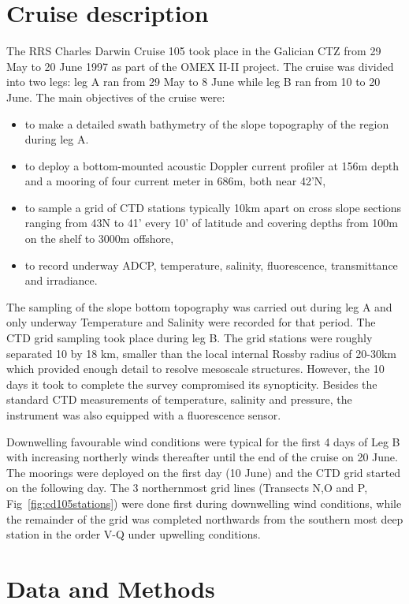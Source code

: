 \section{Cruise description}
The RRS Charles Darwin Cruise 105 took place in the Galician CTZ
from 29 May to 20 June 1997 as part of the OMEX II-II project. The
cruise was divided into two legs: leg A ran from 29 May to 8 June
while leg B ran from 10 to 20 June. The main objectives of the
cruise were:

\begin{itemize}
  \item  to make a detailed swath bathymetry of the slope topography of the
  region during leg A.
  \item  to deploy a
bottom-mounted acoustic Doppler current profiler at 156m depth and
a mooring of four current meter in 686m, both near 42'N,
  \item to sample a grid of CTD stations typically 10km apart on
  cross slope sections ranging from 43\deg N to 41' every 10' of latitude
  and covering depths from 100m on the shelf to 3000m offshore,
  \item to record underway ADCP, temperature, salinity,
  fluorescence, transmittance and irradiance.
\end{itemize}
The sampling of the slope bottom topography was carried out during
leg A and only underway Temperature and Salinity were recorded for
that period. The CTD grid sampling took place during leg B. The
grid stations were roughly separated 10 by 18 km, smaller than the
local internal Rossby radius of 20-30km which provided enough
detail to resolve mesoscale structures. However, the 10 days it
took to complete the survey compromised its synopticity. Besides
the standard CTD measurements of temperature, salinity and
pressure, the instrument was also equipped with a fluorescence
sensor.

Downwelling favourable wind conditions were typical for the first
4 days of Leg B with increasing northerly winds thereafter until
the end of the cruise on 20 June. The moorings were deployed on
the first day (10 June) and the CTD grid started on the following
day. The 3 northernmost grid lines (Transects N,O and P,
Fig~\ref{fig:cd105stations}) were done first during downwelling
wind conditions, while the remainder of the grid was completed
northwards from the southern most deep station in the order V-Q
under upwelling conditions.
\section{Data and Methods}
